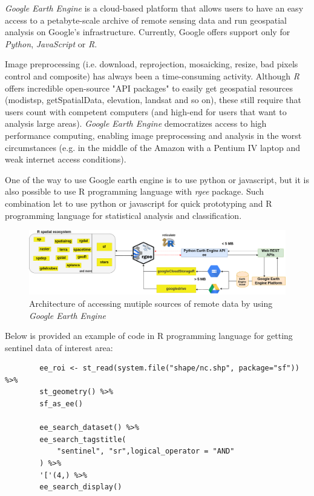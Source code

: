 	\textit{Google Earth Engine} is a cloud-based platform that allows users to have an easy access to a petabyte-scale archive of remote sensing data and run geospatial analysis on Google’s infrastructure. Currently, Google offers support only for \textit{Python}, \textit{JavaScript} or \textit{R}.
	
	Image preprocessing (i.e. download, reprojection, mosaicking, resize, bad pixels control and composite) has always been a time-consuming activity. Although \textit{R} offers incredible open-source "API packages" to easily get geospatial resources (modistsp, getSpatialData, elevation, landsat and so on), these still require that users count with competent computers (and high-end for users that want to analysis large areas). \textit{Google Earth Engine} democratizes access to high performance computing, enabling image preprocessing and analysis in the worst circumstances (e.g. in the middle of the Amazon with a Pentium IV laptop and weak internet access conditions).
	
	One of the way to use Google earth engine is to use python or javascript, but it is also possible to use R programming language with \textit{rgee} package. Such combination let to use python or javascript for quick prototyping and R programming language for statistical analysis and classification.
	
	\begin{figure}[H]
		\centering
		\includegraphics[width=1.0\linewidth]{images/gee.png}
		\caption{Architecture of accessing mutiple sources of remote data by using \textit{Google Earth Engine}}
		\label{fig:gee}
	\end{figure}
	
	Below is provided an example of code  in R programming language for getting sentinel data of interest area:
	
	\begin{lstlisting}
		ee_roi <- st_read(system.file("shape/nc.shp", package="sf")) %>%
		st_geometry() %>%
		sf_as_ee()
		
		ee_search_dataset() %>% 
		ee_search_tagstitle(
			"sentinel", "sr",logical_operator = "AND"
		) %>% 
		'['(4,) %>%
		ee_search_display()
	\end{lstlisting}
	
